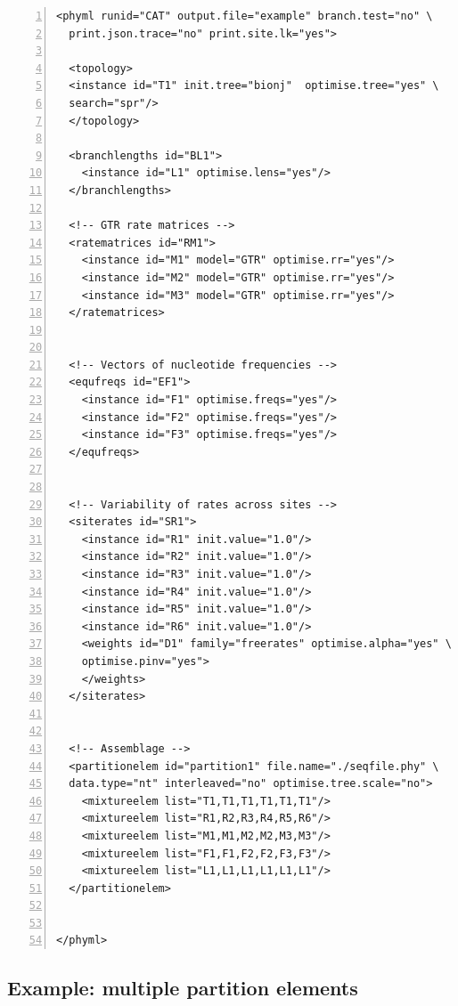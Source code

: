 \documentclass[a4paper,12pt]{article}
\begin{document}
\vspace{0.2cm}
\begin{Verbatim}[frame=single, label=CAT, samepage=true, baselinestretch=0.5,
  fontsize=\small, numbers=left]
  <phyml runid="CAT" output.file="example" branch.test="no" \
  print.json.trace="no" print.site.lk="yes">
  
  <topology>
  <instance id="T1" init.tree="bionj"  optimise.tree="yes" \
  search="spr"/>
  </topology>
  
  <branchlengths id="BL1">
    <instance id="L1" optimise.lens="yes"/>
  </branchlengths>

  <!-- GTR rate matrices -->
  <ratematrices id="RM1">
    <instance id="M1" model="GTR" optimise.rr="yes"/>
    <instance id="M2" model="GTR" optimise.rr="yes"/>
    <instance id="M3" model="GTR" optimise.rr="yes"/>
  </ratematrices>
  

  <!-- Vectors of nucleotide frequencies -->
  <equfreqs id="EF1">
    <instance id="F1" optimise.freqs="yes"/>
    <instance id="F2" optimise.freqs="yes"/>
    <instance id="F3" optimise.freqs="yes"/>
  </equfreqs>


  <!-- Variability of rates across sites -->
  <siterates id="SR1">
    <instance id="R1" init.value="1.0"/>
    <instance id="R2" init.value="1.0"/>
    <instance id="R3" init.value="1.0"/>
    <instance id="R4" init.value="1.0"/>
    <instance id="R5" init.value="1.0"/>
    <instance id="R6" init.value="1.0"/>
    <weights id="D1" family="freerates" optimise.alpha="yes" \
    optimise.pinv="yes">
    </weights>
  </siterates>


  <!-- Assemblage -->
  <partitionelem id="partition1" file.name="./seqfile.phy" \
  data.type="nt" interleaved="no" optimise.tree.scale="no">
    <mixtureelem list="T1,T1,T1,T1,T1,T1"/>
    <mixtureelem list="R1,R2,R3,R4,R5,R6"/>
    <mixtureelem list="M1,M1,M2,M2,M3,M3"/>
    <mixtureelem list="F1,F1,F2,F2,F3,F3"/>
    <mixtureelem list="L1,L1,L1,L1,L1,L1"/>
  </partitionelem>

  
</phyml>
\end{Verbatim}

\subsection{Example: multiple partition elements}
\end{document}
